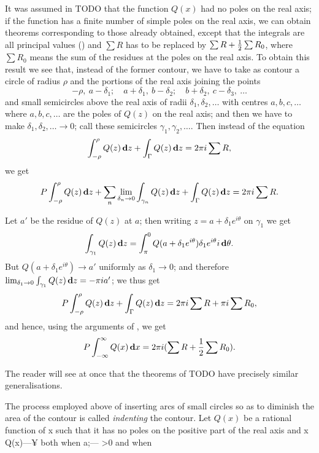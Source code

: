 It was assumed in TODO that the function $Q(x)$ had no
poles on the real axis; if the function has a finite number of simple
poles on the real axis, we can obtain theorems corresponding to those
already obtained, except that the integrals are all principal values
() and $\sum R$ has to be replaced by
$\sum R + \frac{1}{2} \sum R_{0}$, where $\sum R_{0}$ means the
sum of the residues at the poles on the real axis. To obtain this
result we see that, instead of the former contour, we have to take as
contour a circle of radius $\rho$ and the portions of the real axis joining
the points
$$
-\rho, \ a-\delta_{1};
\quad
a+\delta_{1}, \ b-\delta_{2};
\quad
b+\delta_{2}, \ c-\delta_{3},
\ \ldots
$$
and small semicircles above the real axis of radii
$\delta_{1},\delta_{2},\ldots$ with
centres $a, b, c, \ldots$ where $a, b, c, \ldots$ are the poles of
$Q(z)$ on the real axis; and then we have to make
$\delta_{1}, \delta_{2}, \ldots \rightarrow 0$;
call these semicircles $\gamma_{1},\gamma_{2},\ldots$.
Then instead of the equation
$$
\int_{-\rho}^{\rho} Q(z) \, \mathbf{d} z
+
\int_{\Gamma} Q(z) \, \mathbf{d} z
=
2 \pi i \sum R,
$$
we get
$$
P \int_{-\rho}^{\rho} Q(z) \, \mathbf{d} z
+
\sum_{n}
\lim_{\delta_{n} \rightarrow 0}
\int_{\gamma_{n}} Q(z) \, \mathbf{d} z
+
\int_{\Gamma} Q(z) \, \mathbf{d} z
=
2 \pi i \sum R.
$$

Let $a'$ be the residue of $Q(z)$ at $a$; then writing
$z = a + \delta_{1} e^{i\theta}$ on $\gamma_{1}$ we get
$$
\int_{\gamma_{1}} Q(z) \, \mathbf{d} z
=
\int_{\pi}^{0}
Q(a + \delta_{1} e^{i\theta})
\delta_{1} e^{i\theta} i \, \mathbf{d} \theta.
$$
But $Q(a + \delta_{1} e^{i\theta}) \rightarrow a'$ 
uniformly as $\delta_{1} \rightarrow 0$; and therefore
$
\lim_{\delta_{1} \rightarrow 0} \int_{\gamma_{1}} Q(z) \, \mathbf{d} z
=
- \pi i a'
$;
we thus get
$$
P \int_{-\rho}^{\rho} Q(z) \, \mathbf{d} z
+
\int_{\Gamma} Q(z) \, \mathbf{d} z
=
2 \pi i \sum R
+
\pi i \sum R_{0},
$$
and hence, using the arguments of , we get
$$
P \int_{-\infty}^{\infty} Q(x) \, \mathbf{d} x
=
2 \pi i (\sum R + \frac{1}{2} \sum R_{0}).
$$

The reader will see at once that the theorems of TODO have
precisely similar generalisations.

The process employed above of inserting arcs of small circles so as to
diminish the area of the contour is called \emph{indenting} the contour.
Let $Q(x)$ be a rational function of x such that it has no poles on the
positive part of the real axis and x Q(x)—¥ both when a;— >0 and when

